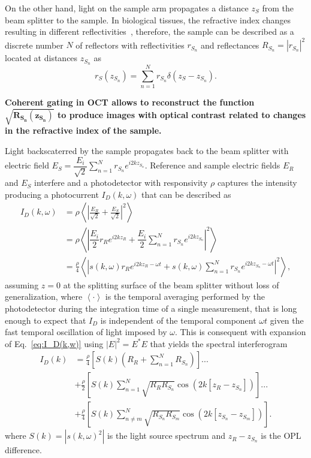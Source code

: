 On the other hand, light on the sample arm propagates a distance $z_S$ from the beam splitter to the sample. In biological tissues, the refractive index changes resulting in different reflectivities~\cite{}, therefore, the sample can be described as a discrete number $N$ of reflectors with reflectivities $r_{S_n}$ and reflectances $R_{S_n}=|r_{S_n}|^2$ located at distances $z_{S_n}$ as
\begin{equation}
    r_S(z_{S_n}) = \sum_{n=1}^N r_{S_n}\delta\left(z_S-z_{S_n}\right).
\end{equation}

\textbf{Coherent gating in OCT allows to reconstruct the function $\mathbf{\sqrt{R_{S_n}(z_{S_n})}}$ to produce images with optical contrast related to changes in the refractive index of the sample.}

Light backscaterred by the sample propagates back to the beam splitter with electric field $E_S=\dfrac{E_i}{\sqrt{2}}\sum\limits_{n=1}^Nr_{S_n}e^{i2kz_{S_n}}$. Reference and sample electric fields $E_R$ and $E_S$ interfere and a photodetector with responsivity $\rho$ captures the intensity producing a photocurrent $I_D(k, \omega)$ that can be described as
\begin{align}\label{eq:I_D(k,w)}
    I_D(k, \omega) &= \rho\left<\left|\frac{E_R}{\sqrt{2}} + \frac{E_S}{\sqrt{2}}\right|^2\right> \nonumber\\
    & = \rho\left<\left|\dfrac{E_i}{2} r_R e^{i2kz_R} + \dfrac{E_i}{2}\sum\limits_{n=1}^Nr_{S_n}e^{i2kz_{S_n}}\right|^2\right> \\
    & = \frac{\rho}{4}\left<\left|s(k,\omega) r_R e^{i2kz_R-\omega t} + s(k,\omega)\sum\limits_{n=1}^Nr_{S_n}e^{i2kz_{S_n}-\omega t}\right|^2\right>, \nonumber
\end{align}
assuming $z=0$ at the splitting surface of the beam splitter without loss of generalization, where $\left<\cdot\right>$ is the temporal averaging performed by the photodetector during the integration time of a single measurement, that is long enough to expect that $I_D$ is independent of the temporal component $\omega t$ given the fast temporal oscillation of light imposed by $\omega$. This is consequent with expansion of Eq.~\eqref{eq:I_D(k,w)} using $|E|^2 = E^*E$ that yields the spectral interferogram
\begin{align}\label{eq:I_D(k)}
I_D(k) &= \frac{\rho}{4}\left[S(k)\left(R_R + \sum_{n=1}^N R_{S_n}\right)\right] ... \nonumber\\
&+ \frac{\rho}{2} \left[S(k)\sum_{n=1}^N\sqrt{R_RR_{S_n}}\cos\left(2k\left[z_R-z_{S_n}\right]\right)\right] ... \\
&+ \frac{\rho}{4}\left[S(k)\sum_{n\neq m}^N\sqrt{R_{S_n}R_{S_m}}\cos\left(2k\left[z_{S_n}-z_{S_m}\right]\right)\right]. \nonumber
\end{align}
where $S(k) = |s(k,\omega)^2|$ is the light source spectrum and $z_R-z_{S_n}$ is the OPL difference.

